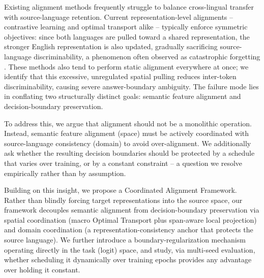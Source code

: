 \documentclass[11pt]{article}
\begin{document}
Existing alignment methods frequently struggle to balance cross-lingual transfer with source-language retention. Current representation-level alignments -- contrastive learning and optimal transport alike -- typically enforce symmetric objectives: since both languages are pulled toward a shared representation, the stronger English representation is also updated, gradually sacrificing source-language discriminability, a phenomenon often observed as catastrophic forgetting \citep{Kirkpatrick_2017, koloski2025measuringcatastrophicforgettingcrosslingual}. These methods also tend to perform static alignment everywhere at once; we identify that this excessive, unregulated spatial pulling reduces inter-token discriminability, causing severe answer-boundary ambiguity. The failure mode lies in conflating two structurally distinct goals: semantic feature alignment and decision-boundary preservation.

To address this, we argue that alignment should not be a monolithic operation. Instead, semantic feature alignment (space) must be actively coordinated with source-language consistency (domain) to avoid over-alignment. We additionally ask whether the resulting decision boundaries should be protected by a schedule that varies over training, or by a constant constraint -- a question we resolve empirically rather than by assumption.

Building on this insight, we propose a Coordinated Alignment Framework. Rather than blindly forcing target representations into the source space, our framework decouples semantic alignment from decision-boundary preservation via spatial coordination (macro Optimal Transport plus span-aware local projection) and domain coordination (a representation-consistency anchor that protects the source language). We further introduce a boundary-regularization mechanism operating directly in the task (logit) space, and study, via multi-seed evaluation, whether scheduling it dynamically over training epochs provides any advantage over holding it constant.
\end{document}
